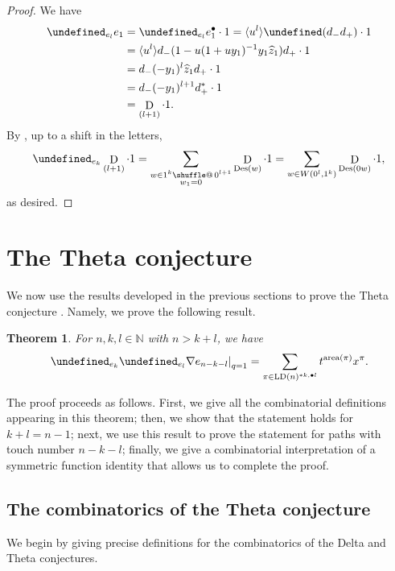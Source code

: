 \documentclass[reqno]{amsart}
\makeatletter
\theoremstyle{plain}
\newtheorem{theorem}{Theorem}[section]
\theoremstyle{definition}
\theoremstyle{remark}
\DeclareMathOperator{\D}{D}
\DeclareMathOperator{\LD}{LD}
\DeclareMathOperator{\area}{area}
\DeclareMathOperator{\Des}{Des}
\newcommand{\z}{\widehat{z}}
\let\oldTheta\Theta
\let\Theta\undefined
\DeclareMathOperator{\Theta}{\oldTheta}
\providecommand*{\shuffle}{%
  \mathbin{\mathpalette\shuffle@{}}%
}
\newcommand*{\shuffle@}[2]{%
  \sbox0{$#1\vcenter{}$}%
  \kern .15\ht0 %
  \rlap{\vrule height .25\ht0 depth 0pt width 2.5\ht0}%
  \raise.1\ht0\hbox to 2.5\ht0{%
    \vrule height 1.75\ht0 depth -.1\ht0 width .17\ht0 %
    \hfill
    \vrule height 1.75\ht0 depth -.1\ht0 width .17\ht0 %
    \hfill
    \vrule height 1.75\ht0 depth -.1\ht0 width .17\ht0 %
  }%
  \kern .15\ht0 %
}
\newcommand{\<}{\langle}
\renewcommand{\>}{\rangle}
\makeatother
\begin{document}
\begin{proof}
    We have 
    \begin{align*}
    \Theta_{e_l} e_1 & =\Theta_{e_l} e_1^\bullet \cdot 1=\langle u^l\rangle \Theta(d_-d_+) \cdot 1 \\
    & = \langle u^l \rangle d_- (1 - u(1+uy_1)^{-1} y_1\z_1) d_+ \cdot 1 \\
    & = d_-(-y_1)^l\z_1 d_+\cdot 1 \\
    & = d_-(-y_1)^{l+1}d_+^* \cdot 1 \\
    & = \D_{(l+1)} \cdot 1.
    \end{align*}
    By , up to a shift in the letters,
    \[ \Theta_{e_k} \D_{(l+1)} \cdot 1 = \sum_{\substack{w \in 1^k \shuffle \, 0^{l+1} \\ w_1 = 0}} \D_{\Des(w)} \cdot 1 
        = \sum_{w\in W\left(0^l,1^k\right)} \D_{\Des(0w)} \cdot 1, \]
    as desired.
\end{proof}


\section{The Theta conjecture}
\label{sec:theta_conjecture}

We now use the results developed in the previous sections to prove the Theta conjecture \cite[Conjecture~9.1]{DAdderioIraciVandenWyngaerd2021ThetaOperators}. Namely, we prove the following result.

\begin{theorem}
    \label{thm:theta_q1}
    For $n,k,l \in \mathbb{N}$ with $n > k+l$, we have
    \[ \left.\Theta_{e_k} \Theta_{e_l} \nabla e_{n-k-l} \right\rvert_{q=1} = \sum_{\pi \in \LD(n)^{\ast k, \bullet l}} t^{\area(\pi)} x^\pi. \]
\end{theorem}

The proof proceeds as follows. First, we give all the combinatorial definitions appearing in this theorem; then, we show that the statement holds for $k+l=n-1$; next, we use this result to prove the statement for paths with touch number $n-k-l$; finally, we give a combinatorial interpretation of a symmetric function identity that allows us to complete the proof.


\subsection{The combinatorics of the Theta conjecture}

We begin by giving precise definitions for the combinatorics of the Delta and Theta conjectures.
\end{document}
